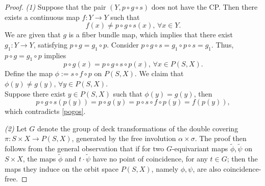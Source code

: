 \documentclass{amsart}
\begin{document}
	\begin{proof} \textit{(1)}
		Suppose %
that the pair $(Y,p \circ g \circ s)$ does not have the CP. 
		Then there exists a continuous map $f : Y \to Y$ such that \begin{equation} \label{pogos}
			f(x) \neq p \circ g \circ s(x), \, \forall x \in Y.
		\end{equation}
		We are given that $g$ is a fiber bundle map, which implies that there exist  $g_1:Y\to Y$, satisfying  $p \circ g = g_1 \circ p.$
		Consider $p\circ g\circ s=g_1\circ p\circ s=g_1 $.
		Thus, $p \circ g = g_1 \circ p$ implies
		\[
		p \circ g(x) = p \circ g \circ s \circ p(x),\, \forall x \in P(S, X).
		\]
		Define the map $\phi := s \circ f \circ p$ on $P(S, X)$. We claim that $\phi(y)\neq g(y), \, \forall y \in P(S,X)$. \\ Suppose there exist $y \in P(S, X)$ such that $\phi(y) = g(y)$, then 
		\[
		p \circ g \circ s(p(y)) = p \circ g(y)
		= p \circ s \circ f \circ p (y) 
		= f(p(y)),
		\]
		which %
contradicts \eqref{pogos}.
		
		
		\textit{(2)} %
		Let $G$ %
denote the group of deck transformations of the double covering $\pi : S \times X \to P(S, X)$, generated by the free involution $\alpha \times \sigma.$
		The proof then follows %
from the general %
observation that if for two $G$-equivariant maps $\tilde\phi, \tilde\psi$ on $S\times X$, the maps $\tilde \phi$ and $t \cdot \tilde\psi$ have no point %
of coincidence, for any $t \in G$; %
then the maps they induce on the orbit space $P(S,X)$, namely $\phi, \psi$, are also coincidence-free.
	\end{proof}
	
\end{document}
